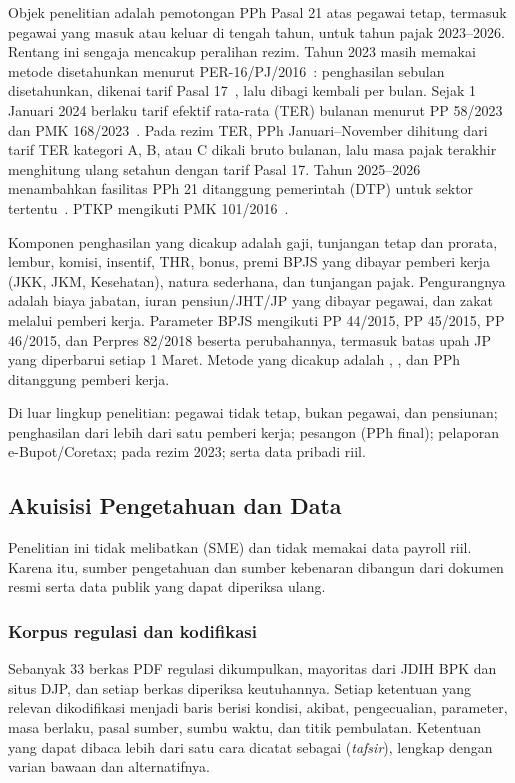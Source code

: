Objek penelitian adalah pemotongan PPh Pasal 21 atas pegawai tetap, termasuk pegawai yang masuk atau keluar di tengah tahun, untuk tahun pajak 2023--2026. Rentang ini sengaja mencakup peralihan rezim. Tahun 2023 masih memakai metode disetahunkan menurut PER-16/PJ/2016~\cite{per16_2016}: penghasilan sebulan disetahunkan, dikenai tarif Pasal 17~\cite{uu7_2021}, lalu dibagi kembali per bulan. Sejak 1 Januari 2024 berlaku tarif efektif rata-rata (TER) bulanan menurut PP 58/2023~\cite{pp58_2023} dan PMK 168/2023~\cite{pmk168_2023}. Pada rezim TER, PPh Januari--November dihitung dari tarif TER kategori A, B, atau C dikali bruto bulanan, lalu masa pajak terakhir menghitung ulang setahun dengan tarif Pasal 17. Tahun 2025--2026 menambahkan fasilitas PPh 21 ditanggung pemerintah (DTP) untuk sektor tertentu~\cite{pmk10_2025,pmk72_2025,pmk105_2025}. PTKP mengikuti PMK 101/2016~\cite{pmk101_2016}.

Komponen penghasilan yang dicakup adalah gaji, tunjangan tetap dan prorata, lembur, komisi, insentif, THR, bonus, premi BPJS yang dibayar pemberi kerja (JKK, JKM, Kesehatan), natura sederhana, dan tunjangan pajak. Pengurangnya adalah biaya jabatan, iuran pensiun/JHT/JP yang dibayar pegawai, dan zakat melalui pemberi kerja. Parameter BPJS mengikuti PP 44/2015, PP 45/2015, PP 46/2015, dan Perpres 82/2018 beserta perubahannya, termasuk batas upah JP yang diperbarui setiap 1 Maret. Metode yang dicakup adalah , , dan PPh ditanggung pemberi kerja.

Di luar lingkup penelitian: pegawai tidak tetap, bukan pegawai, dan pensiunan; penghasilan dari lebih dari satu pemberi kerja; pesangon (PPh final); pelaporan e-Bupot/Coretax;  pada rezim 2023; serta data pribadi riil.

\subsection{Akuisisi Pengetahuan dan Data}
\label{subsec:data}

Penelitian ini tidak melibatkan  (SME) dan tidak memakai data payroll riil. Karena itu, sumber pengetahuan dan sumber kebenaran dibangun dari dokumen resmi serta data publik yang dapat diperiksa ulang.

\subsubsection{Korpus regulasi dan kodifikasi}
Sebanyak 33 berkas PDF regulasi dikumpulkan, mayoritas dari JDIH BPK dan situs DJP, dan setiap berkas diperiksa keutuhannya. Setiap ketentuan yang relevan dikodifikasi menjadi baris berisi kondisi, akibat, pengecualian, parameter, masa berlaku, pasal sumber, sumbu waktu, dan titik pembulatan. Ketentuan yang dapat dibaca lebih dari satu cara dicatat sebagai  (\emph{tafsir}), lengkap dengan varian bawaan dan alternatifnya.

